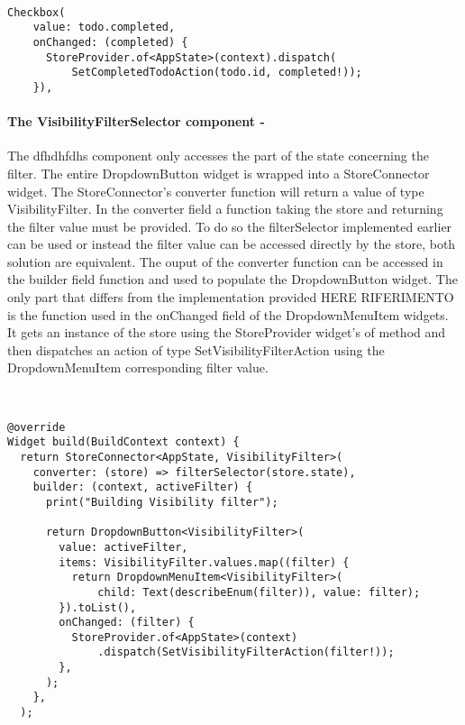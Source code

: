 \begin{code}
\mbox{}\\
 \mbox{}
		\label{code:2.14}
\begin{verbatim}
Checkbox(
    value: todo.completed,
    onChanged: (completed) {
      StoreProvider.of<AppState>(context).dispatch(
          SetCompletedTodoAction(todo.id, completed!));
    }),
\end{verbatim}
\mbox{}
\end{code}

\paragraph{The VisibilityFilterSelector component - }
\label{subpar:todo_app_bloc_core_state}
The dfhdhfdhs component only accesses the part of the state concerning the filter. The entire DropdownButton widget is wrapped into a StoreConnector widget. The StoreConnector’s converter function will return a value of type VisibilityFilter. In the converter field a function taking the store and returning the filter value must be provided. To do so the filterSelector implemented earlier can be used or instead the filter value can be accessed directly by the store, both solution are equivalent. The ouput of the converter function can be accessed in the builder field function and used to populate the DropdownButton widget. The only part that differs from the implementation provided HERE RIFERIMENTO is the function used in the onChanged field of the DropdownMenuItem widgets. It gets an instance of the store using the StoreProvider widget’s of method and then dispatches an action of type SetVisibilityFilterAction using the DropdownMenuItem corresponding filter value.
\begin{code}
\mbox{}\\
 \mbox{}
		\label{code:2.14}
\begin{verbatim}
@override
Widget build(BuildContext context) {
  return StoreConnector<AppState, VisibilityFilter>(
    converter: (store) => filterSelector(store.state),
    builder: (context, activeFilter) {
      print("Building Visibility filter");

      return DropdownButton<VisibilityFilter>(
        value: activeFilter,
        items: VisibilityFilter.values.map((filter) {
          return DropdownMenuItem<VisibilityFilter>(
              child: Text(describeEnum(filter)), value: filter);
        }).toList(),
        onChanged: (filter) {
          StoreProvider.of<AppState>(context)
              .dispatch(SetVisibilityFilterAction(filter!));
        },
      );
    },
  );
\end{verbatim}
\mbox{}
\end{code}

